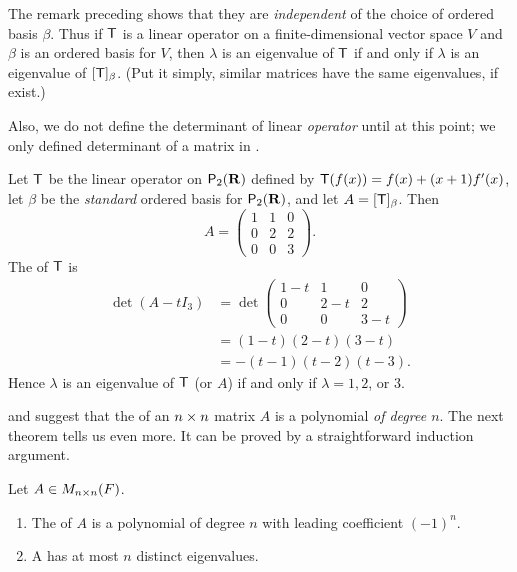\begin{remark} \label{remark 5.1.7}
The remark preceding  shows that they are \emph{independent} of the choice of ordered basis \(\beta\).
Thus if \(\textsf{T}\) is a linear operator on a finite-dimensional vector space \(V\) and \(\beta\) is an ordered basis for \(V\),
then \(\lambda\) is an eigenvalue of \(\textsf{T}\) if and only if \(\lambda\) is an eigenvalue of \([\textsf{T}]_{\beta}\).
(Put it simply, similar matrices have the same eigenvalues, if exist.)

Also, we do not define the determinant of linear \emph{operator} until at this point;
we only defined determinant of a matrix in .
\end{remark}

\begin{example} \label{example 5.1.5}
Let \(\textsf{T}\) be the linear operator on \(\textsf{P}_2(\mathbf{R})\) defined by \(\textsf{T}(f(x)) = f(x) + (x+1)f'(x)\),
let \(\beta\) be the \emph{standard} ordered basis for \(\textsf{P}_2(\mathbf{R})\), and let \(A = [\textsf{T}]_{\beta}\).
Then
\[
    A = \begin{pmatrix} 1 & 1 & 0 \\ 0 & 2 & 2 \\ 0 & 0 & 3 \end{pmatrix}.
\]
The \CPOLY{} of \(\textsf{T}\) is
\begin{align*}
    \det(A - t I_3) & = \det \begin{pmatrix} 1 - t & 1 & 0 \\ 0 & 2 - t & 2 \\ 0 & 0 & 3 - t \end{pmatrix} \\
        & = (1 - t)(2 - t)(3 - t) \\
        & = -(t - 1)(t - 2)(t - 3).
\end{align*}
Hence \(\lambda\) is an eigenvalue of \(\textsf{T}\) (or \(A\)) if and only if \(\lambda = 1, 2\), or \(3\).
\end{example}

 and  suggest that the \CPOLY{} of an \(n \times n\) matrix \(A\) is a polynomial \emph{of degree \(n\)}.
The next theorem tells us even more.
It can be proved by a straightforward induction argument.

\begin{theorem} \label{thm 5.3}
Let \(A \in M_{n \times n}(F)\).
\begin{enumerate}
\item The \CPOLY{} of \(A\) is a polynomial of degree \(n\) with leading coefficient \((-1)^n\).
\item A has at most \(n\) distinct eigenvalues.
\end{enumerate}
\end{theorem}

